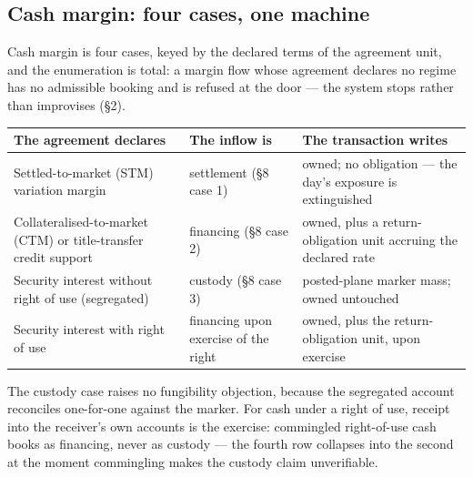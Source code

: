 \subsection{Cash margin: four cases, one machine}

Cash margin is four cases, keyed by the declared terms of the agreement unit,
and the enumeration is total: a margin flow whose agreement declares no regime
has no admissible booking and is refused at the door --- the system stops
rather than improvises (\S2).

\begin{center}
\begin{tabular}{@{}p{}p{}p{}@{}}
\toprule
The agreement declares & The inflow is & The transaction writes \\
\midrule
Settled-to-market (STM) variation margin & settlement (\S8 case 1) & owned; no obligation --- the day's exposure is extinguished \\
Collateralised-to-market (CTM) or title-transfer credit support & financing (\S8 case 2) & owned, plus a return-obligation unit accruing the declared rate \\
Security interest without right of use (segregated) & custody (\S8 case 3) & posted-plane marker mass; owned untouched \\
Security interest with right of use & financing upon exercise of the right & owned, plus the return-obligation unit, upon exercise \\
\bottomrule
\end{tabular}
\end{center}

The custody case raises no fungibility objection, because the segregated
account reconciles one-for-one against the marker. For cash under a right of
use, receipt into the receiver's own accounts is the exercise: commingled
right-of-use cash books as financing, never as custody --- the fourth row
collapses into the second at the moment commingling makes the custody claim
unverifiable.

